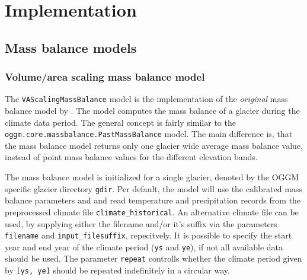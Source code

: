 

\section{Implementation} %
\label{sec:implementation}

    \subsection{Mass balance models} %
    \label{sub:mass_balance_models_implementation}

        \subsubsection{Volume/area scaling mass balance model} %
        \label{ssub:volume_area_scaling_mass_balance_model_implementation}

            The \lstinline`VAScalingMassBalance` model is the implementation of the \textit{original} mass balance model by \citet{Marzeion2012b}. The model computes the mass balance of a glacier during the climate data period. The general concept is fairly similar to the \lstinline`oggm.core.massbalance.PastMassBalance` model. The main difference is, that the \vas{} mass balance model returns only one glacier wide average mass balance value, instead of point mass balance values for the different elevation bands.

            The mass balance model is initialized for a single glacier, denoted by the OGGM specific glacier directory \lstinline`gdir`. Per default, the model will use the calibrated mass balance parameters \mustar{} and \bias{} and read temperature and precipitation records from the preprocessed climate file \lstinline`climate_historical`. An alternative climate file can be used, by supplying either the filename and/or it's suffix via the parameters \lstinline`filename` and \lstinline`input_filesuffix`, repecitvely. It is possible to specify the start year and end year of the climate period (\lstinline`ys` and \lstinline`ye`), if not all available data should be used. The parameter \lstinline`repeat` controlls whether the climate period given by \lstinline`[ys, ye]` should be repeated indefinitely in a circular way.

